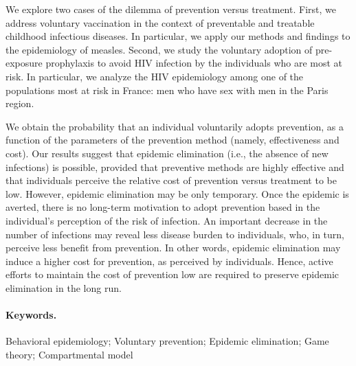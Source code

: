 We explore two cases of the dilemma of prevention versus treatment. First, we address voluntary vaccination in the context of preventable and treatable childhood infectious diseases. In particular, we apply our methods and findings to the epidemiology of measles. 
Second, we study the voluntary adoption of pre-exposure prophylaxis to avoid HIV infection by the individuals who are most at risk. In particular, we analyze the HIV epidemiology among one of the populations most at risk in France: men who have sex with men in the Paris region.



We obtain the probability that an individual voluntarily adopts prevention, as a function of the parameters of the prevention method (namely, effectiveness and cost). Our results suggest that epidemic elimination (i.e., the absence of new infections) is possible, provided that preventive methods are highly effective and that individuals perceive the relative cost of prevention versus treatment to be low.
%
However, epidemic elimination may be only temporary. Once the epidemic is averted, there is no long-term motivation to adopt prevention based in the individual's perception of the risk of infection. An important decrease in the number of infections may reveal  less disease burden to individuals, who, in turn, perceive less benefit from prevention. In other words, epidemic elimination may induce a higher cost for prevention, as perceived by individuals. Hence, active efforts to maintain the cost of prevention low are required to preserve epidemic elimination in the long run.\\

\paragraph{Keywords.} Behavioral epidemiology; Voluntary prevention; Epidemic elimination; Game theory; Compartmental model
